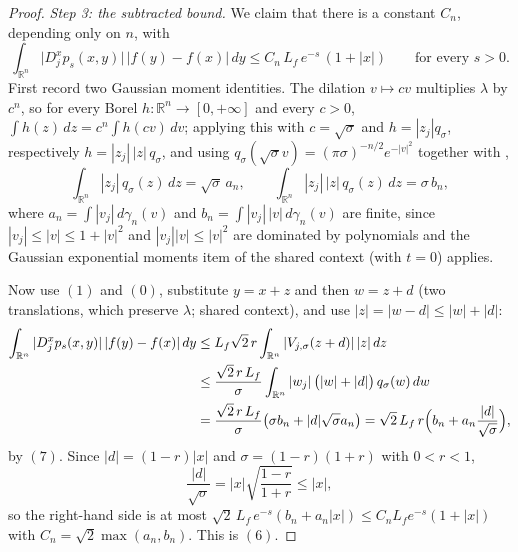 \begin{proof}
\emph{Step 3: the subtracted bound.}
We claim that there is a constant $C_n$, depending only on $n$, with
\begin{equation*}
  \int_{\mathbb{R}^n}\bigl|D_j^xp_s(x,y)\bigr|\,|f(y)-f(x)|\,dy
    \leq C_n\,L_f\,e^{-s}\,(1+|x|)
  \qquad\text{for every } s > 0 . \tag{6}
\end{equation*}
First record two Gaussian moment identities.  The dilation $v \mapsto cv$
multiplies $\lambda$ by $c^n$, so for every Borel
$h : \mathbb{R}^n \to [0,+\infty]$ and every $c > 0$,
$\int h(z)\,dz = c^n\int h(cv)\,dv$; applying this with $c = \sqrt\sigma$ and
$h = |z_j|q_\sigma$, respectively $h = |z_j|\,|z|\,q_\sigma$, and using
$q_\sigma(\sqrt\sigma v) = (\pi\sigma)^{-n/2}e^{-|v|^2}$ together with
,
\begin{equation*}
  \int_{\mathbb{R}^n}|z_j|\,q_\sigma(z)\,dz = \sqrt\sigma\,a_n ,
  \qquad
  \int_{\mathbb{R}^n}|z_j|\,|z|\,q_\sigma(z)\,dz = \sigma\,b_n , \tag{7}
\end{equation*}
where $a_n = \int|v_j|\,d\gamma_n(v)$ and $b_n = \int|v_j|\,|v|\,d\gamma_n(v)$
are finite, since $|v_j| \leq |v| \leq 1+|v|^2$ and $|v_j||v| \leq |v|^2$ are
dominated by polynomials and the Gaussian exponential moments item of the
shared context (with $t = 0$) applies.

Now use $(1)$ and $(0)$, substitute $y = x+z$ and then $w = z+d$ (two
translations, which preserve $\lambda$; shared context), and use
$|z| = |w-d| \leq |w|+|d|$:
\begin{align*}
  \int_{\mathbb{R}^n}|D_j^xp_s(x,y)|\,|f(y)-f(x)|\,dy
    &\leq L_f\sqrt2\,r\int_{\mathbb{R}^n}|V_{j,\sigma}(z+d)|\,|z|\,dz\\
    &\leq \frac{\sqrt2\,r\,L_f}{\sigma}
        \int_{\mathbb{R}^n}|w_j|\,\bigl(|w|+|d|\bigr)\,q_\sigma(w)\,dw\\
    &= \frac{\sqrt2\,r\,L_f}{\sigma}\bigl(\sigma b_n + |d|\sqrt\sigma a_n\bigr)
     = \sqrt2\,L_f\,r\Bigl(b_n + a_n\frac{|d|}{\sqrt\sigma}\Bigr) ,
\end{align*}
by $(7)$.  Since $|d| = (1-r)|x|$ and $\sigma = (1-r)(1+r)$ with $0 < r < 1$,
\[
  \frac{|d|}{\sqrt\sigma} = |x|\sqrt{\frac{1-r}{1+r}} \leq |x| ,
\]
so the right-hand side is at most
$\sqrt2\,L_f\,e^{-s}(b_n+a_n|x|) \leq C_nL_fe^{-s}(1+|x|)$ with
$C_n = \sqrt2\max(a_n,b_n)$.  This is $(6)$.


\end{proof}
